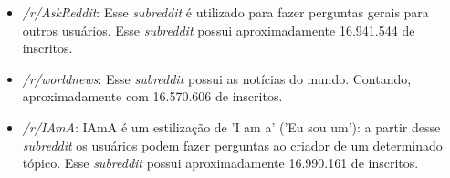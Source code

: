 \begin{itemize}
  \item \textit{/r/AskReddit}: Esse \textit{subreddit} é utilizado para fazer
  perguntas gerais para outros usuários. Esse \textit{subreddit} possui
  aproximadamente 16.941.544 de inscritos.
  \item \textit{/r/worldnews}: Esse \textit{subreddit} possui as notícias do
  mundo. Contando, aproximadamente com 16.570.606 de inscritos.
  \item \textit{/r/IAmA}: IAmA é um estilização de 'I am a' ('Eu sou um'):
  a partir desse \textit{subreddit} os usuários podem fazer perguntas ao criador
  de um determinado tópico. Esse \textit{subreddit} possui aproximadamente
  16.990.161 de inscritos.
\end{itemize}

% 



